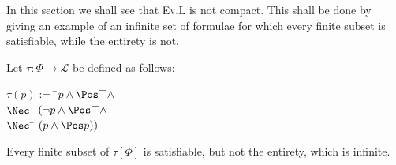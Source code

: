 In this section we shall see that \textsc{EviL} is not compact.  This
shall be done by giving an example of an infinite set of formulae for which every finite subset is satisfiable, while the entirety is not.

\begin{lemma}
Let $\tau : \Phi \to \mathcal{L}$ be defined as follows:
\begin{center}
\begin{minipage}{3in}
\begin{tabbing}
	$\tau(p) := $ \=$p \wedge \Pos\top \wedge$ \\
	\> $\Nec$ \= $(\neg p \wedge \Pos\top \wedge$\\
	\> \> $\Nec$ \= $(p \wedge \Pos p))$
\end{tabbing}
\end{minipage}
\end{center}
Every finite subset of $\tau[\Phi]$ is satisfiable, but not the entirety, which is infinite. 
\end{lemma}
